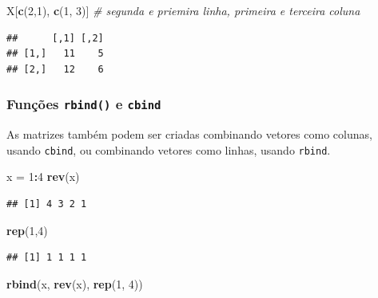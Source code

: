 \documentclass[
]{book}
\newenvironment{Shaded}{\begin{snugshade}}{\end{snugshade}}
\newcommand{\CommentTok}[1]{\textcolor[rgb]{0.56,0.35,0.01}{\textit{#1}}}
\newcommand{\DecValTok}[1]{\textcolor[rgb]{0.00,0.00,0.81}{#1}}
\newcommand{\KeywordTok}[1]{\textcolor[rgb]{0.13,0.29,0.53}{\textbf{#1}}}
\newcommand{\NormalTok}[1]{#1}
\newcommand{\OperatorTok}[1]{\textcolor[rgb]{0.81,0.36,0.00}{\textbf{#1}}}
\newcommand{\StringTok}[1]{\textcolor[rgb]{0.31,0.60,0.02}{#1}}
\theoremstyle{definition}
\theoremstyle{definition}
\theoremstyle{definition}
\theoremstyle{remark}
\begin{document}
\begin{Shaded}
\begin{Highlighting}[]
\NormalTok{X[}\KeywordTok{c}\NormalTok{(}\DecValTok{2}\NormalTok{,}\DecValTok{1}\NormalTok{), }\KeywordTok{c}\NormalTok{(}\DecValTok{1}\NormalTok{, }\DecValTok{3}\NormalTok{)] }\CommentTok{# segunda e priemira linha, primeira e terceira coluna}
\end{Highlighting}
\end{Shaded}

\begin{verbatim}
##      [,1] [,2]
## [1,]   11    5
## [2,]   12    6
\end{verbatim}

\hypertarget{funuxe7uxf5es-rbind-e-cbind}{%
\subsubsection{\texorpdfstring{Funções \texttt{rbind()} e \texttt{cbind}}{Funções rbind() e cbind}}\label{funuxe7uxf5es-rbind-e-cbind}}

As matrizes também podem ser criadas combinando vetores como colunas, usando \texttt{cbind}, ou combinando vetores como linhas, usando \texttt{rbind}.

\begin{Shaded}
\begin{Highlighting}[]
\NormalTok{x =}\StringTok{ }\DecValTok{1}\OperatorTok{:}\DecValTok{4}
\KeywordTok{rev}\NormalTok{(x)}
\end{Highlighting}
\end{Shaded}

\begin{verbatim}
## [1] 4 3 2 1
\end{verbatim}

\begin{Shaded}
\begin{Highlighting}[]
\KeywordTok{rep}\NormalTok{(}\DecValTok{1}\NormalTok{,}\DecValTok{4}\NormalTok{)}
\end{Highlighting}
\end{Shaded}

\begin{verbatim}
## [1] 1 1 1 1
\end{verbatim}

\begin{Shaded}
\begin{Highlighting}[]
\KeywordTok{rbind}\NormalTok{(x, }\KeywordTok{rev}\NormalTok{(x), }\KeywordTok{rep}\NormalTok{(}\DecValTok{1}\NormalTok{, }\DecValTok{4}\NormalTok{))}
\end{Highlighting}
\end{Shaded}
\end{document}

